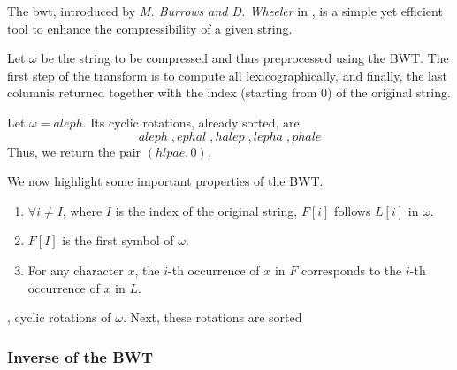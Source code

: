 \documentclass{subfiles}
\begin{document}
    The \gls{bwt}, introduced by \emph{M. Burrows and D. Wheeler} in 
    \cite{burrows1994}, is a simple yet efficient tool to enhance the 
    compressibility of a given string.

    Let \(\omega\) be the string to be compressed and thus preprocessed 
    using the BWT. The first step of the transform is to compute all 
    lexicographically\footnotemark, and finally, the last column\footnotemark is 
    returned together with the index (starting from 0) of the original string.
    \begin{example*}
        Let \(\omega = aleph\). Its cyclic rotations, already sorted, are
        \[
            aleph \;, ephal \;, halep \;, lepha \;, phale
        \]
        Thus, we return the pair \((hlpae, 0)\).
    \end{example*}

    We now highlight some important properties of the BWT.
    \begin{enumerate}
        \item \(\forall i \ne I\), where \(I\) is the index of the original 
              string, \(F[i]\) follows \(L[i]\) in \(\omega\).
        \item \(F[I]\) is the first symbol of \(\omega\).
        \item For any character \(x\), the \(i\)-th occurrence of \(x\) in \(F\)
              corresponds to the \(i\)-th occurrence of \(x\) in \(L\).
    \end{enumerate}

    ,
    cyclic rotations of \(\omega\). Next, these rotations are sorted 

    \subsubsection{Inverse of the BWT}
    
\end{document}
